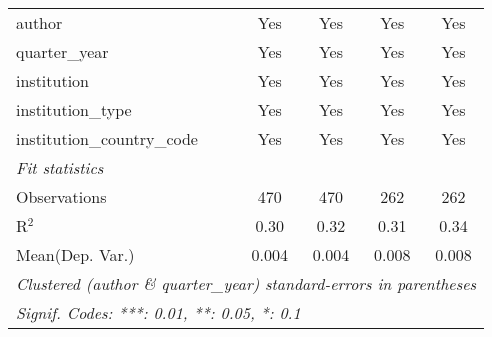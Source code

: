 \begin{tabular}{lcccc}
   author                                   & Yes     & Yes          & Yes     & Yes\\  
   quarter\_year                            & Yes     & Yes          & Yes     & Yes\\  
   institution                              & Yes     & Yes          & Yes     & Yes\\  
   institution\_type                        & Yes     & Yes          & Yes     & Yes\\  
   institution\_country\_code               & Yes     & Yes          & Yes     & Yes\\  
   \midrule
   \emph{Fit statistics}\\
   Observations                             & 470     & 470          & 262     & 262\\  
   R$^2$                                    & 0.30    & 0.32         & 0.31    & 0.34\\  
Mean(Dep. Var.) & 0.004 & 0.004 & 0.008 & 0.008 \\
   \midrule \midrule
   \multicolumn{5}{l}{\emph{Clustered (author \& quarter\_year) standard-errors in parentheses}}\\
   \multicolumn{5}{l}{\emph{Signif. Codes: ***: 0.01, **: 0.05, *: 0.1}}\\
\end{tabular}
\par\endgroup

